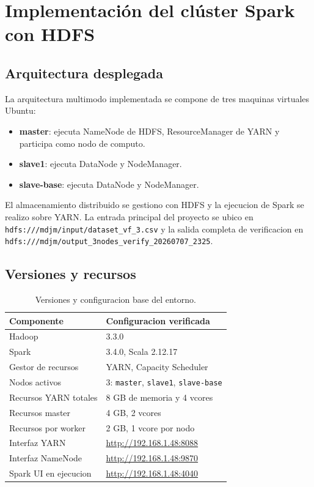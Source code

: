 \section{Implementaci\'on del cl\'uster Spark con HDFS}

\subsection{Arquitectura desplegada}

La arquitectura multimodo implementada se compone de tres maquinas virtuales Ubuntu:

\begin{itemize}
    \item \textbf{master}: ejecuta NameNode de HDFS, ResourceManager de YARN y participa como nodo de computo.
    \item \textbf{slave1}: ejecuta DataNode y NodeManager.
    \item \textbf{slave-base}: ejecuta DataNode y NodeManager.
\end{itemize}

El almacenamiento distribuido se gestiono con HDFS y la ejecucion de Spark se realizo sobre YARN. La entrada principal del proyecto se ubico en \texttt{hdfs:///mdjm/input/dataset\_vf\_3.csv} y la salida completa de verificacion en \texttt{hdfs:///mdjm/output\_3nodes\_verify\_20260707\_2325}.

\subsection{Versiones y recursos}

\begin{table}[H]
    \centering
    \caption{Versiones y configuracion base del entorno.}
    \label{tab:versions}
    \begin{tabularx}{\textwidth}{lX}
        \toprule
        \textbf{Componente} & \textbf{Configuracion verificada} \\
        \midrule
        Hadoop & 3.3.0 \\
        Spark & 3.4.0, Scala 2.12.17 \\
        Gestor de recursos & YARN, Capacity Scheduler \\
        Nodos activos & 3: \texttt{master}, \texttt{slave1}, \texttt{slave-base} \\
        Recursos YARN totales & 8 GB de memoria y 4 vcores \\
        Recursos master & 4 GB, 2 vcores \\
        Recursos por worker & 2 GB, 1 vcore por nodo \\
        Interfaz YARN & \url{http://192.168.1.48:8088} \\
        Interfaz NameNode & \url{http://192.168.1.48:9870} \\
        Spark UI en ejecucion & \url{http://192.168.1.48:4040} \\
        \bottomrule
    \end{tabularx}
\end{table}

